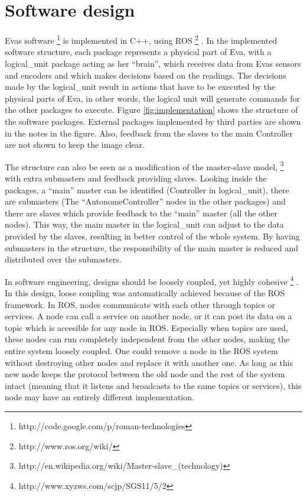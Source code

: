 \documentclass[technical_document.tex]{subfiles}
\begin{document}
\section{Software design}
Eva\textquotesingle s software \footnote{http://code.google.com/p/roman-technologies} is implemented in C++, using ROS 
\footnote{http://www.ros.org/wiki/} . In the implemented software structure, each package represents a physical part of Eva, with a 
logical\_unit package acting as her ``brain'', which receives data from Eva\textquotesingle s sensors and encoders and which makes decisions based on the readings. The decisions made by the logical\_unit result in actions that have to be executed 
by the physical parts of Eva, in other words, the logical unit will generate commands for the other packages to execute. 
Figure \ref{fig:implementation} shows the structure of the software packages. External packages implemented by third 
parties are shown in the notes in the figure. Also, feedback from the slaves to the main Controller are not shown to keep 
the image clear.

The structure can also be seen as a modification of the master-slave model, \footnote{http://en.wikipedia.org/wiki/Master-slave\_(technology)} with extra submasters and feedback providing slaves. 
Looking inside the packages, a ``main'' master can be identified (Controller in logical\_unit), 
there are submasters (The ``AutonomeController'' nodes in the other packages) and there are slaves which provide 
feedback to the ``main'' master (all the other nodes). This way, the main master in the logical\_unit can adjust to the 
data provided by the slaves, resulting in better control of the whole system. By having submasters in the structure, the 
responsibility of the main master is reduced and distributed over the submasters. 

In software engineering, designs should be loosely coupled, yet highly cohesive \footnote{http://www.xyzws.com/scjp/SGS11/5/2} . In this design, loose coupling was automatically achieved because of the 
ROS framework. In ROS, nodes communicate with each other through topics or services. A node can call a service on 
another node, or it can post its data on a topic which is accesible for any node in ROS. Especially when topics are used, 
these nodes can run completely independent from the other nodes, making the entire system loosely coupled. One could 
remove a node in the ROS system without destroying other nodes and replace it with another one. As long as this new node 
keeps the protocol between the old node and the rest of the system intact (meaning that it listens and broadcasts to the 
same topics or services), this node may have an entirely different implementation.
\end{document}
